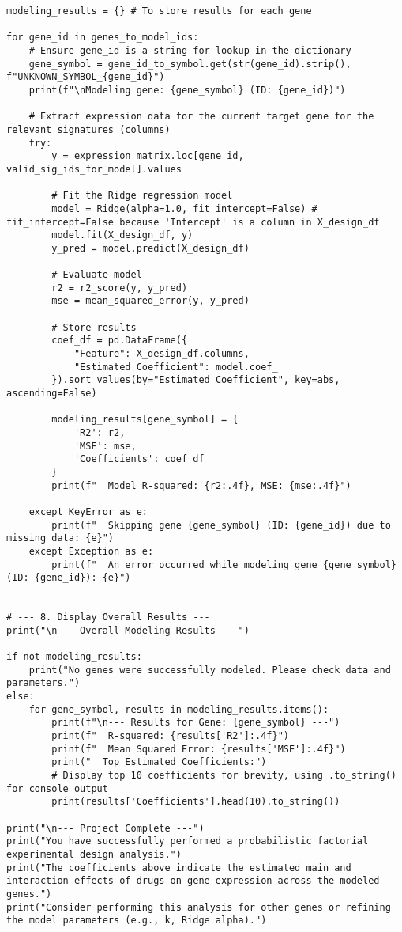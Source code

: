 \documentclass[12pt]{article}
\begin{document}
\begin{lstlisting}[caption={Python Analysis Script}]
modeling_results = {} # To store results for each gene

for gene_id in genes_to_model_ids:
    # Ensure gene_id is a string for lookup in the dictionary
    gene_symbol = gene_id_to_symbol.get(str(gene_id).strip(), f"UNKNOWN_SYMBOL_{gene_id}")
    print(f"\nModeling gene: {gene_symbol} (ID: {gene_id})")

    # Extract expression data for the current target gene for the relevant signatures (columns)
    try:
        y = expression_matrix.loc[gene_id, valid_sig_ids_for_model].values
        
        # Fit the Ridge regression model
        model = Ridge(alpha=1.0, fit_intercept=False) # fit_intercept=False because 'Intercept' is a column in X_design_df
        model.fit(X_design_df, y)
        y_pred = model.predict(X_design_df)

        # Evaluate model
        r2 = r2_score(y, y_pred)
        mse = mean_squared_error(y, y_pred)

        # Store results
        coef_df = pd.DataFrame({
            "Feature": X_design_df.columns,
            "Estimated Coefficient": model.coef_
        }).sort_values(by="Estimated Coefficient", key=abs, ascending=False)

        modeling_results[gene_symbol] = {
            'R2': r2,
            'MSE': mse,
            'Coefficients': coef_df
        }
        print(f"  Model R-squared: {r2:.4f}, MSE: {mse:.4f}")

    except KeyError as e:
        print(f"  Skipping gene {gene_symbol} (ID: {gene_id}) due to missing data: {e}")
    except Exception as e:
        print(f"  An error occurred while modeling gene {gene_symbol} (ID: {gene_id}): {e}")


# --- 8. Display Overall Results ---
print("\n--- Overall Modeling Results ---")

if not modeling_results:
    print("No genes were successfully modeled. Please check data and parameters.")
else:
    for gene_symbol, results in modeling_results.items():
        print(f"\n--- Results for Gene: {gene_symbol} ---")
        print(f"  R-squared: {results['R2']:.4f}")
        print(f"  Mean Squared Error: {results['MSE']:.4f}")
        print("  Top Estimated Coefficients:")
        # Display top 10 coefficients for brevity, using .to_string() for console output
        print(results['Coefficients'].head(10).to_string())

print("\n--- Project Complete ---")
print("You have successfully performed a probabilistic factorial experimental design analysis.")
print("The coefficients above indicate the estimated main and interaction effects of drugs on gene expression across the modeled genes.")
print("Consider performing this analysis for other genes or refining the model parameters (e.g., k, Ridge alpha).")
\end{lstlisting}
\printbibliography
\end{document}
